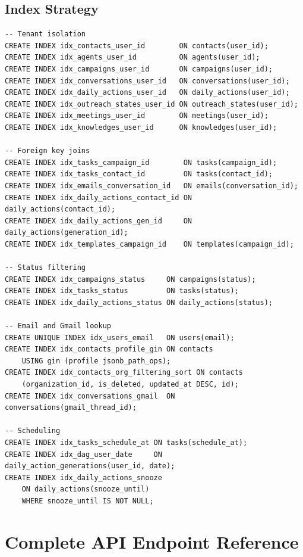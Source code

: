 \documentclass[a4paper]{article}
\begin{document}
\subsection{Index Strategy}

\begin{tcolorbox}[sqlstyle, title=Index Definitions]
\begin{Verbatim}[fontsize=\small]
-- Tenant isolation
CREATE INDEX idx_contacts_user_id        ON contacts(user_id);
CREATE INDEX idx_agents_user_id          ON agents(user_id);
CREATE INDEX idx_campaigns_user_id       ON campaigns(user_id);
CREATE INDEX idx_conversations_user_id   ON conversations(user_id);
CREATE INDEX idx_daily_actions_user_id   ON daily_actions(user_id);
CREATE INDEX idx_outreach_states_user_id ON outreach_states(user_id);
CREATE INDEX idx_meetings_user_id        ON meetings(user_id);
CREATE INDEX idx_knowledges_user_id      ON knowledges(user_id);

-- Foreign key joins
CREATE INDEX idx_tasks_campaign_id        ON tasks(campaign_id);
CREATE INDEX idx_tasks_contact_id         ON tasks(contact_id);
CREATE INDEX idx_emails_conversation_id   ON emails(conversation_id);
CREATE INDEX idx_daily_actions_contact_id ON daily_actions(contact_id);
CREATE INDEX idx_daily_actions_gen_id     ON daily_actions(generation_id);
CREATE INDEX idx_templates_campaign_id    ON templates(campaign_id);

-- Status filtering
CREATE INDEX idx_campaigns_status     ON campaigns(status);
CREATE INDEX idx_tasks_status         ON tasks(status);
CREATE INDEX idx_daily_actions_status ON daily_actions(status);

-- Email and Gmail lookup
CREATE UNIQUE INDEX idx_users_email   ON users(email);
CREATE INDEX idx_contacts_profile_gin ON contacts
    USING gin (profile jsonb_path_ops);
CREATE INDEX idx_contacts_org_filtering_sort ON contacts
    (organization_id, is_deleted, updated_at DESC, id);
CREATE INDEX idx_conversations_gmail  ON conversations(gmail_thread_id);

-- Scheduling
CREATE INDEX idx_tasks_schedule_at ON tasks(schedule_at);
CREATE INDEX idx_dag_user_date     ON daily_action_generations(user_id, date);
CREATE INDEX idx_daily_actions_snooze
    ON daily_actions(snooze_until)
    WHERE snooze_until IS NOT NULL;
\end{Verbatim}
\end{tcolorbox}



\newpage
\section{Complete API Endpoint Reference}
\label{appendix:api-reference}
\end{document}
